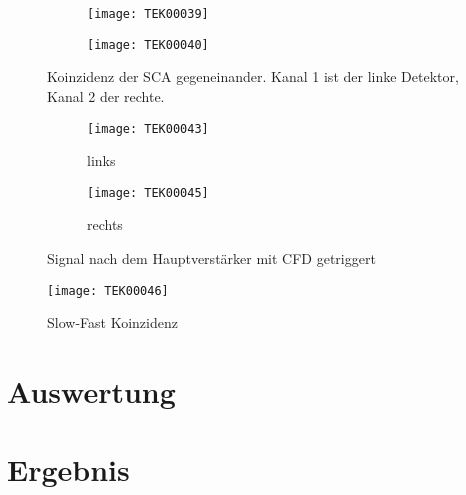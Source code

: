 \documentclass[11pt, ngerman, fleqn, DIV=15, headinclude, BCOR=2cm]{scrreprt}
\begin{document}
\fehlt%

\begin{figure}
	\centering
	\begin{subfigure}{0.49 \textwidth}
		\texttt{[image: TEK00039]}
	\end{subfigure}
	\begin{subfigure}{0.49 \textwidth}
		\texttt{[image: TEK00040]}
	\end{subfigure}
	\caption{%
		Koinzidenz der SCA gegeneinander. Kanal 1 ist der linke
		Detektor, Kanal 2 der rechte.
	}
	\label{fig:ba_slow_signal_sca_koinzidenz}
\end{figure}



\begin{figure}
	\centering
	\begin{subfigure}{0.49 \textwidth}
		\texttt{[image: TEK00043]}
		\caption{%
			links
		}
		\label{fig:ba_fast_signal_cfd_trig-li}
	\end{subfigure}
	\begin{subfigure}{0.49 \textwidth}
		\texttt{[image: TEK00045]}
		\caption{%
			rechts
		}
		\label{fig:ba_fast_signal_cfd_trig-re}
	\end{subfigure}
	\caption{%
		Signal nach dem Hauptverstärker mit CFD getriggert
	}
	\label{fig:ba_fast_signal_cfd_trig}
\end{figure}

\begin{figure}
	\centering
	\texttt{[image: TEK00046]}
	\caption{%
		Slow-Fast Koinzidenz
	}
	\label{fig:ba_slow_fast_koinzidenz}
\end{figure}

\fehlt%

\chapter{Auswertung}


\chapter{Ergebnis}



\begin{appendix}


\end{appendix}
\end{document}

